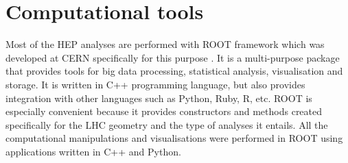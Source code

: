 \section{Computational tools}
Most of the HEP analyses are performed with ROOT framework which was developed at CERN specifically for this purpose \citep{root}. It is a multi-purpose package that provides tools for big data processing, statistical analysis, visualisation and storage. It is written in C++ programming language, but also provides integration with other languages such as Python, Ruby, R, etc.  ROOT is especially convenient because it provides constructors and methods created specifically for the LHC geometry and the type of analyses it entails. All the computational manipulations and visualisations were performed in ROOT using applications written in C++ and Python. 




 

